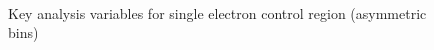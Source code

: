 \begin{figure}
\begin{center}
         \\
        \caption{Key analysis variables for single electron control region (asymmetric bins)}
        \label{fig:distribution_singleele_asym}
    \end{center}
\end{figure}

